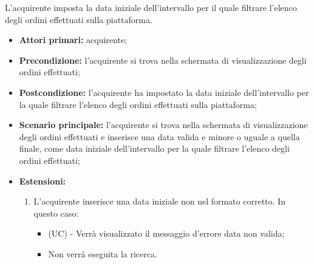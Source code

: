 L'acquirente imposta la data iniziale dell'intervallo per il quale filtrare l'elenco degli ordini effettuati sulla piattaforma.
\begin{itemize}
    \item \textbf{Attori primari:} acquirente;
    \item \textbf{Precondizione:} l'acquirente si trova nella schermata di visualizzazione degli ordini effettuati;
    \item \textbf{Postcondizione:} l'acquirente ha impostato la data iniziale dell'intervallo per la quale filtrare l'elenco degli ordini effettuati sulla piattaforma;
    \item \textbf{Scenario principale:} l'acquirente si trova nella schermata di visualizzazione degli ordini effettuati e inserisce una data valida e minore o uguale a quella finale, come data iniziale dell'intervallo per la quale filtrare l'elenco degli ordini effettuati;
    \item \textbf{Estensioni:}
    \begin{enumerate}[label=\lett]
        \item L'acquirente inserisce una data iniziale non nel formato corretto. In questo caso:
        \begin{itemize}
            \item (UC) - Verrà visualizzato il messaggio d'errore data non valida;
            \item Non verrà eseguita la ricerca.
        \end{itemize} 
    \end{enumerate}
\end{itemize}

